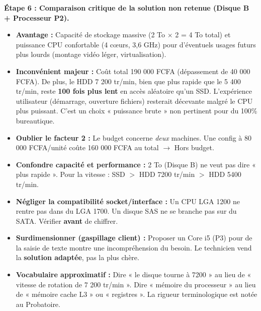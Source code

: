 \documentclass[11pt]{article}
\begin{document}
\begin{exoresolu}
\textbf{Étape 6 : Comparaison critique de la solution non retenue (Disque B + Processeur P2).}
\begin{itemize}
\item \textbf{Avantage :} Capacité de stockage massive (2 To $\times$ 2 = 4 To total) et puissance CPU confortable (4 cœurs, 3,6 GHz) pour d'éventuels usages futurs plus lourds (montage vidéo léger, virtualisation).
\item \textbf{Inconvénient majeur :} Coût total 190 000 FCFA (dépassement de 40 000 FCFA). De plus, le HDD 7 200 tr/min, bien que plus rapide que le 5 400 tr/min, reste \textbf{100 fois plus lent} en accès aléatoire qu'un SSD. L'expérience utilisateur (démarrage, ouverture fichiers) resterait décevante malgré le CPU plus puissant. C'est un choix « puissance brute » non pertinent pour du 100\% bureautique.
\end{itemize}
\end{exoresolu}

\begin{attention}
\begin{itemize}
\item \textbf{Oublier le facteur 2 :} Le budget concerne \emph{deux} machines. Une config à 80 000 FCFA/unité coûte 160 000 FCFA au total $\rightarrow$ Hors budget.
\item \textbf{Confondre capacité et performance :} 2 To (Disque B) ne veut pas dire « plus rapide ». Pour la vitesse : SSD $>$ HDD 7200 tr/min $>$ HDD 5400 tr/min.
\item \textbf{Négliger la compatibilité socket/interface :} Un CPU LGA 1200 ne rentre pas dans du LGA 1700. Un disque SAS ne se branche pas sur du SATA. Vérifier \textbf{avant} de chiffrer.
\item \textbf{Surdimensionner (gaspillage client) :} Proposer un Core i5 (P3) pour de la saisie de texte montre une incompréhension du besoin. Le technicien vend la \textbf{solution adaptée}, pas la plus chère.
\item \textbf{Vocabulaire approximatif :} Dire « le disque tourne à 7200 » au lieu de « vitesse de rotation de 7 200 tr/min ». Dire « mémoire du processeur » au lieu de « mémoire cache L3 » ou « registres ». La rigueur terminologique est notée au Probatoire.
\end{itemize}
\end{attention}
\end{document}
